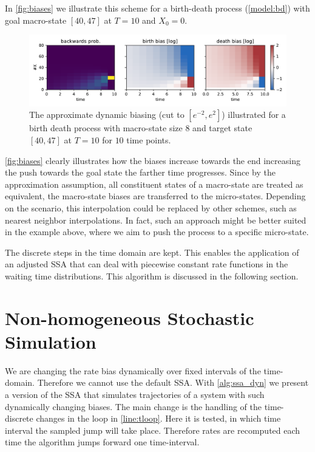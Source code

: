 In \autoref{fig:biases} we illustrate this scheme for a birth-death process (\autoref{model:bd}) with goal macro-state $[40,47]$ at $T=10$
and $X_0=0$.
\begin{figure}
    \centering
    \includegraphics[width=\textwidth]{gfx/biases.pdf}
    \caption[Approximate biasing]{\label{fig:biases}The approximate dynamic biasing (cut to $[e^{-2}, e^{2}]$) illustrated for a birth death process with macro-state size $8$ and target state $[40, 47]$ at $T=10$ for $10$ time points.}
\end{figure}
\autoref{fig:biases} clearly illustrates how the biases increase towards the end increasing the push towards the goal state the farther time progresses.
Since by the approximation assumption, all constituent states of a macro-state are treated as equivalent, the macro-state biases are transferred to the micro-states.
Depending on the scenario, this interpolation could be replaced by other schemes, such as nearest neighbor interpolations.
In fact, such an approach might be better suited in the example above, where we aim to push the process to a specific micro-state.

The discrete steps in the time domain are kept.
This enables the application of an adjusted \ac{SSA} that can deal with piecewise constant rate functions in the waiting time distributions.
This algorithm is discussed in the following section.

\section{Non-homogeneous Stochastic Simulation}
We are changing the rate bias dynamically over fixed intervals of the time-domain.
Therefore we cannot use the default \ac{SSA}.
With \autoref{alg:ssa_dyn} we present a version of the \acl{SSA} that simulates trajectories of a system with such dynamically changing biases.
The main change is the handling of the time-discrete changes in the loop in \autoref{line:tloop}.
Here it is tested, in which time interval the sampled jump will take place.
Therefore rates are recomputed each time the algorithm jumps forward one time-interval.

